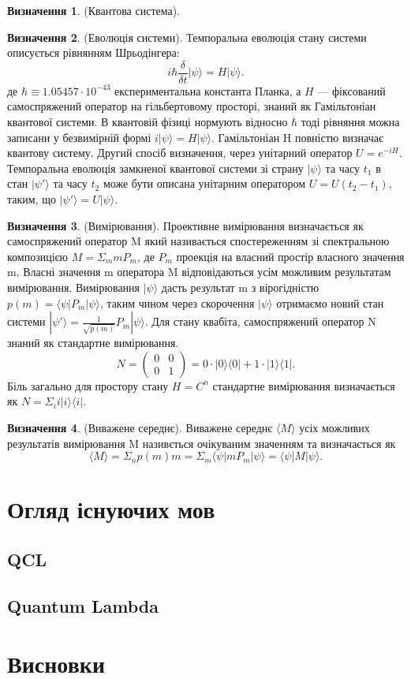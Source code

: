 \documentclass{article}
\theoremstyle{definition}
\newtheorem{definition}{Визначення}
\begin{document}
\begin{definition} (Квантова система).
\end{definition}

\begin{definition} (Еволюція системи).
Темпоральна еволюція стану системи описується рівнянням Шрьодінгера:
$$
i\hbar\frac{\delta}{\delta t}|\psi\rangle = H|\psi\rangle.
$$
де $\hbar \equiv 1.05457 \cdot 10^{-43}$ експериментальна константа Планка,
а $H$ --- фіксований самоспряжений оператор на гільбертовому просторі,
знаний як Гамільтоніан квантової системи. В квантовій фізиці нормують відносно
$\hbar$ тоді рівняння можна записани у безвимірній формі $i|\psi\rangle = H|\psi\rangle$.
Гамільтоніан H повністю визначає квантову систему.
Другий спосіб визначення, через унітарний оператор $U=e^{-iH}$.
Темпоральна еволюція замкненої квантової системи зі страну $|\psi\rangle$ та часу $t_1$
в стан $|\psi'\rangle$ та часу $t_2$ може бути описана унітарним оператором
$U = U (t_2 - t_1)$, таким, що $|\psi'\rangle = U |\psi\rangle$.
\end{definition}

\begin{definition} (Вимірювання).
Проективне вимірювання визначається як самоспряжений оператор M який називається
спостереженням зі спектральною композицією $M = \Sigma_m mP_m$, де $P_m$ проекція
на власний простір власного значення m. Власні значення m оператора M відповідаються
усім можливим результатам вимірювання. Вимірювання $|\psi\rangle$ дасть результат
m з вірогідністю $p(m) = \langle\psi|P_m|\psi\rangle$, таким чином через
скорочення $|\psi\rangle$ отримаємо новий стан системи $|\psi'\rangle = \frac{1}{\sqrt{p(m)}}P_m|\psi\rangle$.
Для стану квабіта, самоспряжений оператор N знаний як стандартне вимірювання.
$$
N = \begin{pmatrix} 0 & 0 \\ 0 & 1 \end{pmatrix} = 0 \cdot |0\rangle\langle 0| + 1 \cdot|1\rangle\langle1|.
$$
Біль загально для простору стану $H=C^n$ стандартне вимірювання визначається як $N=\Sigma_i i|i\rangle\langle i|$.
\end{definition}

\begin{definition} (Виважене середнє).
Виважене середнє $\langle M \rangle$ усіх можливих результатів вимірювання M називється
очікуваним значенням та визначається як
$$
\langle M\rangle = \Sigma_n p(m)m = \Sigma_m \langle\psi|m P_m|\psi\rangle = \langle \psi | M | \psi \rangle.
$$
\end{definition}



\section{Огляд існуючих мов}

\subsection{QCL}

\subsection{Quantum Lambda}

\section{Висновки}



\end{document}
